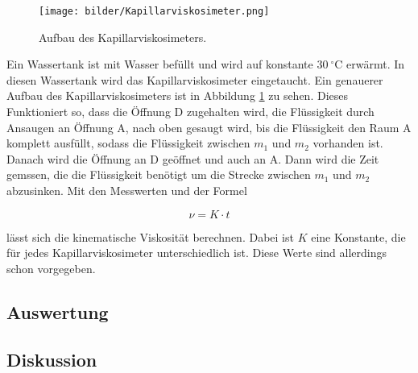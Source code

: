             \begin{figure}[h]
                \centering
                \texttt{[image: bilder/Kapillarviskosimeter.png]}
                \caption{Aufbau des Kapillarviskosimeters.}
                \label{fig:Kapillarviskosimeter}
            \end{figure}

            Ein Wassertank ist mit Wasser befüllt und wird auf konstante $30\ \mathrm{^\circ C}$ erwärmt. In diesen Wassertank wird das Kapillarviskosimeter eingetaucht. Ein genauerer Aufbau des Kapillarviskosimeters ist in Abbildung \ref{fig:Kapillarviskosimeter} zu sehen. Dieses Funktioniert so, dass die Öffnung D zugehalten wird, die Flüssigkeit durch Ansaugen an Öffnung A, nach oben gesaugt wird, bis die Flüssigkeit den Raum A komplett ausfüllt, sodass die Flüssigkeit zwischen $m_1$ und $m_2$ vorhanden ist. Danach wird die Öffnung an D geöffnet und auch an A. Dann wird die Zeit gemssen, die die Flüssigkeit benötigt um die Strecke zwischen $m_{1}$ und $m_{2}$ abzusinken. Mit den Messwerten und der Formel

            \begin{equation}
                \nu = K \cdot t
            \end{equation}

            lässt sich die kinematische Viskosität berechnen. Dabei ist $K$ eine Konstante, die für jedes Kapillarviskosimeter unterschiedlich ist. Diese Werte sind allerdings schon vorgegeben.

        \subsection{Auswertung}

        \subsection{Diskussion}